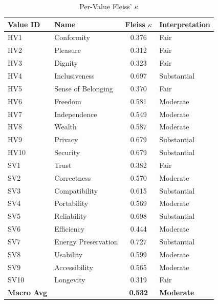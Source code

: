\begin{table}[htbp]
\centering
\caption{Per-Value Fleiss' $\kappa$}
\label{tab:per-value-kappa}
\begin{tabular}{l l c l}
\toprule
Value ID & Name & Fleiss $\kappa$ & Interpretation \\
\midrule
HV1 & Conformity & 0.376 & Fair \\
HV2 & Pleasure & 0.312 & Fair \\
HV3 & Dignity & 0.323 & Fair \\
HV4 & Inclusiveness & 0.697 & Substantial \\
HV5 & Sense of Belonging & 0.370 & Fair \\
HV6 & Freedom & 0.581 & Moderate \\
HV7 & Independence & 0.549 & Moderate \\
HV8 & Wealth & 0.587 & Moderate \\
HV9 & Privacy & 0.679 & Substantial \\
HV10 & Security & 0.679 & Substantial \\
SV1 & Trust & 0.382 & Fair \\
SV2 & Correctness & 0.570 & Moderate \\
SV3 & Compatibility & 0.615 & Substantial \\
SV4 & Portability & 0.569 & Moderate \\
SV5 & Reliability & 0.698 & Substantial \\
SV6 & Efficiency & 0.444 & Moderate \\
SV7 & Energy Preservation & 0.727 & Substantial \\
SV8 & Usability & 0.599 & Moderate \\
SV9 & Accessibility & 0.565 & Moderate \\
SV10 & Longevity & 0.319 & Fair \\
\midrule
\textbf{Macro Avg} & & \textbf{0.532} & \textbf{Moderate} \\
\bottomrule
\end{tabular}
\end{table}